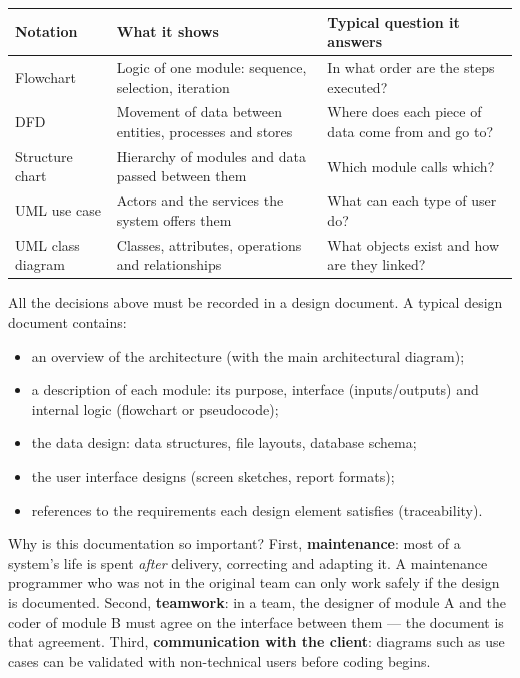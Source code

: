 \documentclass[11pt]{article}
\newcommand{\cle}[1]{{\popxbold\color{popdark}#1}}
\newcounter{popsec}
\newcounter{popsub}
\newcommand{\courssub}[1]{%
  \stepcounter{popsub}%
  \par\vspace{9pt}\noindent{\popxbold\fontsize{11.5}{13}\selectfont\color{popink}{\color{poporange}\thepopsec.\thepopsub}\hspace{6pt}#1}\par\nopagebreak\vspace{4pt}
}
\begin{document}
\begin{center}
\begin{tabularx}{\linewidth}{|l|X|X|}
\hline
\rowcolor{popblueL} \textbf{Notation} & \textbf{What it shows} & \textbf{Typical question it answers} \\
\hline
Flowchart & Logic of one module: sequence, selection, iteration & In what order are the steps executed? \\
\hline
DFD & Movement of data between entities, processes and stores & Where does each piece of data come from and go to? \\
\hline
Structure chart & Hierarchy of modules and data passed between them & Which module calls which? \\
\hline
UML use case & Actors and the services the system offers them & What can each type of user do? \\
\hline
UML class diagram & Classes, attributes, operations and relationships & What objects exist and how are they linked? \\
\hline
\end{tabularx}
\end{center}

\courssub{Design Documentation}

All the decisions above must be recorded in a \cle{design document}. A typical design document contains:

\begin{itemize}
\item an overview of the architecture (with the main architectural diagram);
\item a description of each module: its purpose, interface (inputs/outputs) and internal logic (flowchart or pseudocode);
\item the data design: data structures, file layouts, database schema;
\item the user interface designs (screen sketches, report formats);
\item references to the requirements each design element satisfies (traceability).
\end{itemize}

Why is this documentation so important? First, \textbf{maintenance}: most of a system's life is spent \emph{after} delivery, correcting and adapting it. A maintenance programmer who was not in the original team can only work safely if the design is documented. Second, \textbf{teamwork}: in a team, the designer of module A and the coder of module B must agree on the interface between them — the document is that agreement. Third, \textbf{communication with the client}: diagrams such as use cases can be validated with non-technical users before coding begins.
\end{document}
